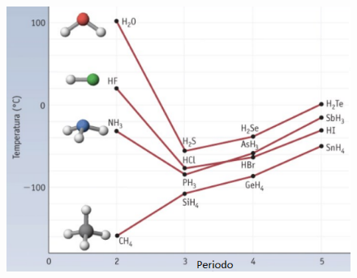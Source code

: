 \begin{figure}[htp]
    \centering
    \includegraphics[width=12cm]{immagini/temperature_ebollizione.png}
\end{figure}